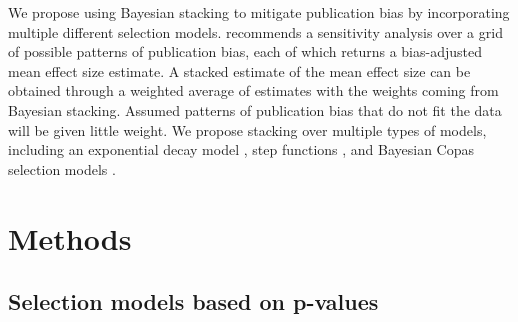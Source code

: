 \documentclass[12pt]{article}   	%
\numberwithin{equation}{section}
\begin{document}
We propose using Bayesian stacking to mitigate publication bias by incorporating multiple different selection models. \citet{copas2001sensitivity} recommends a sensitivity analysis over a grid of possible patterns of publication bias, each of which returns a bias-adjusted mean effect size estimate. A stacked estimate of the mean effect size can be obtained through a weighted average of estimates with the weights coming from Bayesian stacking. Assumed patterns of publication bias that do not fit the data will be given little weight. We propose stacking over multiple types of models, including an exponential decay model \citep{givens1997}, step functions \citep{hedges1992selection, vevea1995pubbias}, and Bayesian Copas selection models \citet{mavridis2013copas, bai2020}. 

\section{Methods} \label{sec:methods}

\subsection{Selection models based on p-values} \label{sec:pvalue}
\end{document}
